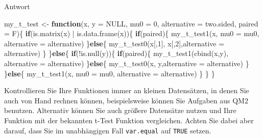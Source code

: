 \documentclass[
]{book}
\newenvironment{Shaded}{\begin{snugshade}}{\end{snugshade}}
\newcommand{\AttributeTok}[1]{\textcolor[rgb]{0.77,0.63,0.00}{#1}}
\newcommand{\ConstantTok}[1]{\textcolor[rgb]{0.00,0.00,0.00}{#1}}
\newcommand{\ControlFlowTok}[1]{\textcolor[rgb]{0.13,0.29,0.53}{\textbf{#1}}}
\newcommand{\DecValTok}[1]{\textcolor[rgb]{0.00,0.00,0.81}{#1}}
\newcommand{\FunctionTok}[1]{\textcolor[rgb]{0.00,0.00,0.00}{#1}}
\newcommand{\NormalTok}[1]{#1}
\newcommand{\OtherTok}[1]{\textcolor[rgb]{0.56,0.35,0.01}{#1}}
\newcommand{\SpecialCharTok}[1]{\textcolor[rgb]{0.00,0.00,0.00}{#1}}
\newcommand{\StringTok}[1]{\textcolor[rgb]{0.31,0.60,0.02}{#1}}
\begin{document}
Antwort

\begin{Shaded}
\begin{Highlighting}[]
\NormalTok{my\_t\_test }\OtherTok{\textless{}{-}} \ControlFlowTok{function}\NormalTok{(x,}
                      \AttributeTok{y =} \ConstantTok{NULL}\NormalTok{,}
                      \AttributeTok{mu0 =} \DecValTok{0}\NormalTok{,}
                      \AttributeTok{alternative =} \StringTok{\textquotesingle{}two.sided\textquotesingle{}}\NormalTok{, }
                      \AttributeTok{paired =}\NormalTok{ F)\{}
  \ControlFlowTok{if}\NormalTok{(}\FunctionTok{is.matrix}\NormalTok{(x) }\SpecialCharTok{|} \FunctionTok{is.data.frame}\NormalTok{(x))\{}
    \ControlFlowTok{if}\NormalTok{(paired)\{}
      \FunctionTok{my\_t\_test1}\NormalTok{(x, }\AttributeTok{mu0 =}\NormalTok{ mu0, }\AttributeTok{alternative =}\NormalTok{ alternative)}
\NormalTok{    \}}\ControlFlowTok{else}\NormalTok{\{}
      \FunctionTok{my\_t\_test0}\NormalTok{(x[,}\DecValTok{1}\NormalTok{], x[,}\DecValTok{2}\NormalTok{],}\AttributeTok{alternative =}\NormalTok{ alternative)}
\NormalTok{    \}}
\NormalTok{  \}}\ControlFlowTok{else}\NormalTok{\{}
    \ControlFlowTok{if}\NormalTok{(}\SpecialCharTok{!}\FunctionTok{is.null}\NormalTok{(y))\{}
      \ControlFlowTok{if}\NormalTok{(paired)\{}
        \FunctionTok{my\_t\_test1}\NormalTok{(}\FunctionTok{cbind}\NormalTok{(x,y), }\AttributeTok{alternative =}\NormalTok{ alternative)}
\NormalTok{      \}}\ControlFlowTok{else}\NormalTok{\{}
        \FunctionTok{my\_t\_test0}\NormalTok{(x, y,}\AttributeTok{alternative =}\NormalTok{ alternative)}
\NormalTok{      \}}
\NormalTok{    \}}\ControlFlowTok{else}\NormalTok{\{}
      \FunctionTok{my\_t\_test1}\NormalTok{(x, }\AttributeTok{mu0 =}\NormalTok{ mu0, }\AttributeTok{alternative =}\NormalTok{ alternative)}
\NormalTok{    \}}
\NormalTok{  \}}
\NormalTok{\}}
\end{Highlighting}
\end{Shaded}

Kontrollieren Sie Ihre Funktionen immer an kleinen Datensätzen, in denen Sie auch von Hand rechnen können, beispielsweise können Sie Aufgaben aus QM2 benutzen.
Alternativ können Sie auch größere Datensätze nutzen und Ihre Funktion mit der bekannten t-Test Funktion vergleichen. Achten Sie dabei aber darauf, dass Sie im unabhängigen Fall \texttt{var.equal} auf \texttt{TRUE} setzen.

  
\end{document}
